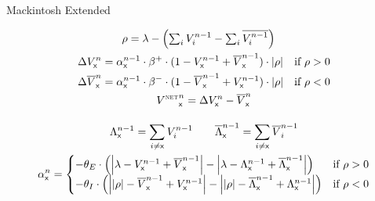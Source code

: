 \documentclass[varwidth]{standalone}
\begin{document}
\newcommand{\eks}{\textsf{x}}
\newcommand{\longlambda}{\rlap{$\,\lambda$}\phantom{\big| \rho \big|}}
\newcommand{\longI}{\rlap{$I$}\phantom{E}}

\begin{center}
	\huge
	\sffamily
	Mackintosh Extended
\end{center}
\begin{gather*}
	\begin{aligned}
		\rho &= \lambda - \left( \textstyle\sum_i V_i^{n - 1} - \textstyle\sum_i \overline{V_i^{n - 1}} \right)
	\end{aligned} \\
	\begin{aligned}
		\Delta V_\eks^n &= \alpha_\eks^{n - 1} \cdot \beta^+ \cdot (1 - V_\eks^{n - 1} + \overline{V}_\eks^{n - 1}) \cdot \left| \rho \right| & \text{if } \rho > 0 \\
		 \Delta \overline{V}_\eks^n &= \alpha_\eks^{n - 1} \cdot \beta^- \cdot (1 - \overline{V}_\eks^{n - 1} + V_\eks^{n - 1}) \cdot \left| \rho \right| & \text{if } \rho < 0
	\end{aligned} \\
	{V^{\text{\tiny\scshape NET}}}_\eks^n = \Delta V_\eks^n - \overline{V}_\eks^n \\[1em]
	\Lambda^{n - 1}_\eks = \sum_{i \neq \eks} V^{n - 1}_i \qquad
	\overline{\Lambda}^{n - 1}_\eks = \sum_{i \neq \eks} \overline{V}^{n - 1}_i \\
	\alpha_\eks^n =
		\begin{cases}
			- \theta_E \cdot \left( \left| \lambda - V^{n - 1}_\eks + \overline{V}^{n - 1}_\eks \right| - \left| \lambda - \Lambda^{n - 1}_\eks + \overline{\Lambda}^{n - 1}_\eks \right| \right) &\text{if } \rho > 0 \\
			- \theta_I \cdot \left( \left| \left| \rho \right| - \overline{V}^{n - 1}_\eks + V^{n - 1}_\eks \right| - \left| \left| \rho \right| - \overline{\Lambda}^{n - 1}_\eks + \Lambda^{n - 1}_\eks \right| \right) &\text{if } \rho < 0
		\end{cases}
\end{gather*}

\nocite{lepelley}

\end{document}
